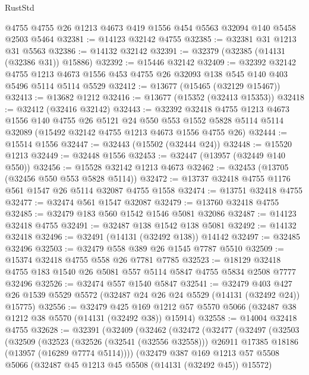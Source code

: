 \begin{lexlean}{RustStd}
\begin{coremodule}
    @4755
    @4755
    @26
    @1213
    @4673
    @419
    @1556
    @454
    @5563
    @32094
    @140
    @5458
    @2503
    @5464
@32381 := @14123 @32142 @4755
@32385 := @32381 @31 @1213 @31 @5563
@32386 := @14132 @32142
@32391 := @32379 (@32385 (@14131 (@32386 @31)) @15886)
@32392 := @15446 @32142
@32409 := @32392
    @32142
    @4755
    @1213
    @4673
    @1556
    @453
    @4755
    @26
    @32093
    @138
    @545
    @140
    @403
    @5496
    @5114
    @5114
    @5529
@32412 := @13677 (@15465 (@32129 @15467))
@32413 := @13682 @1212
@32416 := @13677 (@15352 (@32413 @15353))
@32418 := @32412 (@32416 @32142)
@32443 := @32392
    @32418
    @4755
    @1213
    @4673
    @1556
    @140
    @4755
    @26
    @5121
    @24
    @550
    @553
    @1552
    @5828
    @5114
    @5114
    @32089
    (@15492 @32142 @4755 @1213 @4673 @1556 @4755 @26)
@32444 := @15514 @1556
@32447 := @32443 (@15502 (@32444 @24))
@32448 := @15520 @1213
@32449 := @32448 @1556
@32453 := @32447 (@13957 (@32449 @140 @550))
@32456 := @15528 @32142 @1213 @4673
@32462 := @32453 (@13705 (@32456 @550 @553 @5828 @5114))
@32472 := @13737 @32418 @4755 @1176 @561 @1547 @26 @5114 @32087 @4755 @1558
@32474 := @13751 @32418 @4755
@32477 := @32474 @561 @1547 @32087
@32479 := @13760 @32418 @4755
@32485 := @32479 @183 @560 @1542 @1546 @5081 @32086
@32487 := @14123 @32418 @4755
@32491 := @32487 @138 @1542 @138 @5081
@32492 := @14132 @32418
@32496 := @32491 (@14131 (@32492 @138)) @14142
@32497 := @32485 @32496
@32503 := @32479 @558 @389 @26 @1545 @7787 @5510
@32509 := @15374 @32418 @4755 @558 @26 @7781 @7785
@32523 := @18129 @32418 @4755 @183 @1540 @26 @5081 @557 @5114 @5847 @4755 @5834 @2508 @7777 @32496
@32526 := @32474 @557 @1540 @5847
@32541 := @32479
    @403
    @427
    @26
    @1539
    @5529
    @5572
    (@32487 @24 @26 @24 @5529 (@14131 (@32492 @24)) @15775)
@32556 := @32479
    @425
    @169
    @1212
    @57
    @5570
    @5066
    (@32487 @38 @1212 @38 @5570 (@14131 (@32492 @38)) @15914)
@32558 := @14004 @32418 @4755
@32628 := @32391
    (@32409
      (@32462
        (@32472
          (@32477
            (@32497
              (@32503
                (@32509
                  (@32523
                    (@32526 (@32541 (@32556 @32558)))
                    @26911
                    @17385
                    @18186
                    (@13957 (@16289 @7774 @5114))))
                (@32479
                  @387
                  @169
                  @1213
                  @57
                  @5508
                  @5066
                  (@32487 @45 @1213 @45 @5508 (@14131 (@32492 @45)) @15572)

\end{coremodule}
\end{lexlean}
